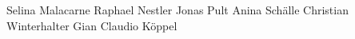 Selina Malacarne
Raphael Nestler
Jonas Pult
Anina Schälle
Christian Winterhalter
Gian Claudio Köppel
